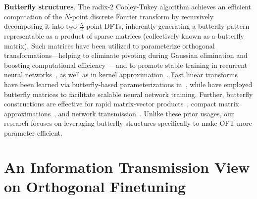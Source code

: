 \textbf{Butterfly structures}. The radix-2 Cooley-Tukey algorithm achieves an efficient computation of the $N$-point discrete Fourier transform by recursively decomposing it into two $\frac{N}{2}$-point DFTs, inherently generating a butterfly pattern representable as a product of sparse matrices (collectively known as a butterfly matrix). Such matrices have been utilized to parameterize orthogonal transformations—helping to eliminate pivoting during Gaussian elimination and boosting computational efficiency~\cite{parker1995random}—and to promote stable training in recurrent neural networks~\cite{jing2017tunable}, as well as in kernel approximation~\cite{munkhoeva2018quadrature}. Fast linear transforms have been learned via butterfly-based parameterizations in~\cite{dao2019learning,dao2019kaleidoscope}, while \cite{chen2022pixelated,dao2022monarch} have employed butterfly matrices to facilitate scalable neural network training. Further, butterfly constructions are effective for rapid matrix-vector products~\cite{michielssen1996multilevel,o2010algorithm}, compact matrix approximations~\cite{li2015butterfly}, and network transmission~\cite{klasing1994broadcasting,li2003linear,rajasingh2016transmission}. Unlike these prior usages, our research focuses on leveraging butterfly structures specifically to make OFT more parameter efficient.

\section{An Information Transmission View on Orthogonal Finetuning}

